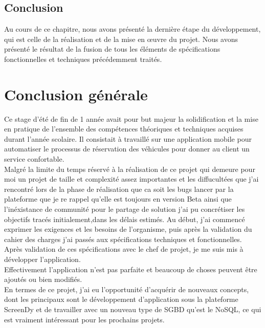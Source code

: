 \documentclass[12pt,a4paper]{report}
\begin{document}
	\section{Conclusion}
Au cours de ce chapitre, nous avons présenté la dernière étape du développement, qui est
celle de la réalisation et de la mise en œuvre du projet. Nous avons présenté le résultat de la fusion
de tous les éléments de spécifications fonctionnelles et techniques précédemment traités.





		\chapter*{Conclusion générale} 
	Ce stage d’été de fin de 1 année avait pour but majeur la solidification et la mise en
pratique de l’ensemble des compétences théoriques et techniques acquises durant l’année scolaire. Il
consistait à travaillé sur une application mobile pour automatiser le processus de réservation des véhicules pour donner au client un service confortable.\\
Malgré la limite du temps réservé à la réalisation de ce projet qui demeure pour moi un projet
de taille et complexité assez importantes et les diffucultées que j'ai rencontré lors de la phase de réalisation que ca soit les bugs lancer par la plateforme que je re rappel qu'elle est toujours en version Beta ainsi que l'inéxistance de communité pour le partage de solution j'ai pu concrétiser les objectifs tracés initialement,dans les délais estimés. Au début, j'ai commencé exprimer les exigences et les besoins de l’organisme, puis après la validation du cahier des charges j'ai passés aux
spécifications techniques et fonctionnelles. Après validation de ces spécifications avec le chef de
projet, je me suis mis à développer l'application.\\
Effectivement l'application n'est pas parfaite et beaucoup de choses peuvent être ajoutés ou bien modifiés.\\
En termes de ce projet, j'ai eu l’opportunité d’acquérir de nouveaux concepts, dont les principaux sont le développement d'application sous la plateforme ScreenDy et de travailler avec un nouveau type de SGBD qu'est le NoSQL, ce qui est vraiment intéressant pour les prochains
projets.\\
	
\end{document}
